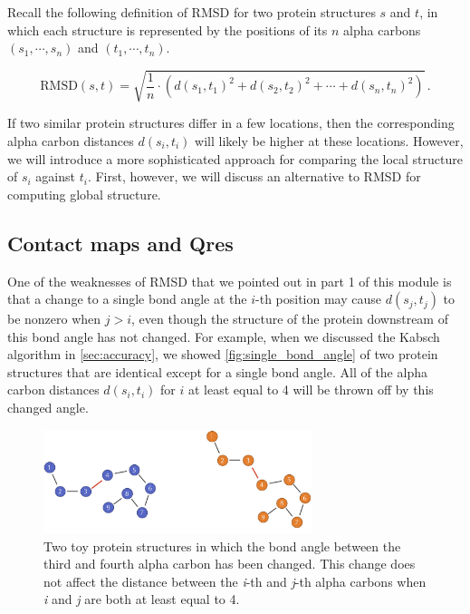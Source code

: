 {{\begin{qbox}\end{qbox}

Recall the following definition of RMSD for two protein structures $s$ and $t$, in which each structure is represented by the positions of its $n$ alpha carbons $(s_{1}, \cdots, s_{n})$ and $(t_{1}, \cdots, t_{n})$.

$$\text{RMSD}(s, t) = \sqrt{\dfrac{1}{n} \cdot (d(s_1, t_1)^2 + d(s_2, t_2)^2 + \cdots + d(s_n, t_n)^2)}\,. $$

If two similar protein structures differ in a few locations, then the corresponding alpha carbon distances $d(s_{i}, t_{i})$ will likely be higher at these locations. However, we will introduce a more sophisticated approach for
comparing the local structure of $s_{i}$ against $t_{i}$. First, however, we will discuss an alternative to RMSD for computing global structure.

\FloatBarrier
{}
\subsection{Contact maps and Qres}

One of the weaknesses of RMSD that we pointed out in part 1 of this module is that a change to a single bond angle at the $i$-th position may cause $d(s_{j}, t_{j})$ to be nonzero when $j > i$, even though the structure of the protein downstream of this bond angle has not changed. For example, when we discussed the Kabsch algorithm in \autoref{sec:accuracy}, we showed \autoref{fig:single_bond_angle} of two protein structures that are identical except for a single bond angle. All of the alpha carbon distances $d(s_{i}, t_{i})$ for $i$ at least equal to 4 will be thrown off by this changed angle.

\begin{figure}[h]
	\centering
	\mySfFamily
	\includegraphics[width = 0.7\textwidth]{../images/single_bond_angle.png}
	\caption{Two toy protein structures in which the bond angle between the third and fourth alpha carbon has been changed. This change does not affect the distance between the \textit{i}-th and \textit{j}-th alpha carbons when \textit{i} and \textit{j} are both at least equal to 4.}
	\label{fig:single_bond_angle}
\end{figure}

}}
